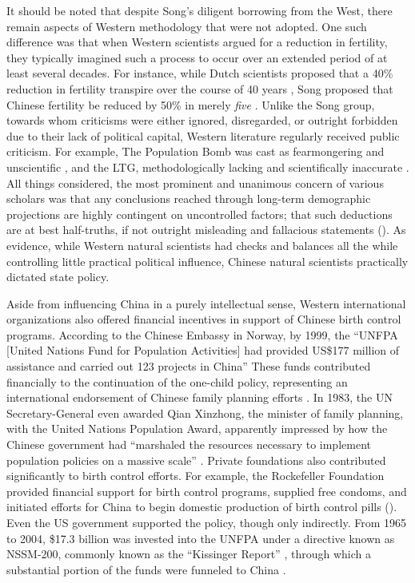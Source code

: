 \documentclass[12pt, a4paper, twoside]{article}
\begin{document}
It should be noted that despite Song’s diligent borrowing from the West, there remain aspects of Western methodology that were not adopted. One such difference was that when Western scientists argued for a reduction in fertility, they typically imagined such a process to occur over an extended period of at least several decades. For instance, while Dutch scientists proposed that a 40\% reduction in fertility transpire over the course of 40 years \autocite[p.\ 365]{Kwakernaak1977}, Song proposed that Chinese fertility be reduced by 50\% in merely \emph{five} \autocite[p.\ 163]{Greenhalgh2008JustOneChild}. Unlike the Song group, towards whom criticisms were either ignored, disregarded, or outright forbidden due to their lack of political capital, Western literature regularly received public criticism. For example, The Population Bomb was cast as fearmongering and unscientific \autocite[pp.\ 66--70]{Revelle1971}, and the LTG, methodologically lacking and scientifically inaccurate \autocite[pp.\ 1182--1183]{Nordhaus1973}. All things considered, the most prominent and unanimous concern of various scholars was that any conclusions reached through long-term demographic projections are highly contingent on uncontrolled factors; that such deductions are at best half-truths, if not outright misleading and fallacious statements (\cites[p.\ 1183]{Nordhaus1973}[p.\ 52]{Sanderson1994SimulationModels}[p.\ 133]{ColeEtAl1973}). As evidence, while Western natural scientists had checks and balances all the while controlling little practical political influence, Chinese natural scientists practically dictated state policy.

Aside from influencing China in a purely intellectual sense, Western international organizations also offered financial incentives in support of Chinese birth control programs. According to the Chinese Embassy in Norway, by 1999, the “UNFPA [United Nations Fund for Population Activities] had provided US\$177 million of assistance and carried out 123 projects in China” \autocite[pp.\ 953--954]{WangEtAl2016AJS} These funds contributed financially to the continuation of the one-child policy, representing an international endorsement of Chinese family planning efforts \autocite[p.\ 102]{YiFuxian2013}. In 1983, the UN Secretary-General even awarded Qian Xinzhong, the minister of family planning, with the United Nations Population Award, apparently impressed by how the Chinese government had “marshaled the resources necessary to implement population policies on a massive scale” \autocite{PDR1983UNPopAward}. Private foundations also contributed significantly to birth control efforts. For example, the Rockefeller Foundation provided financial support for birth control programs, supplied free condoms, and initiated efforts for China to begin domestic production of birth control pills (\cites[p.\ 119]{Chung2002}[p.\ 954]{WangEtAl2016AJS}). Even the US government supported the policy, though only indirectly. From 1965 to 2004, \$17.3 billion was invested into the UNFPA under a directive known as NSSM-200, commonly known as the “Kissinger Report” \autocite[p.\ 27]{Clowes2004KissingerReport}, through which a substantial portion of the funds were funneled to China \autocite[p.\ 956]{WangEtAl2016AJS}. 
\end{document}
